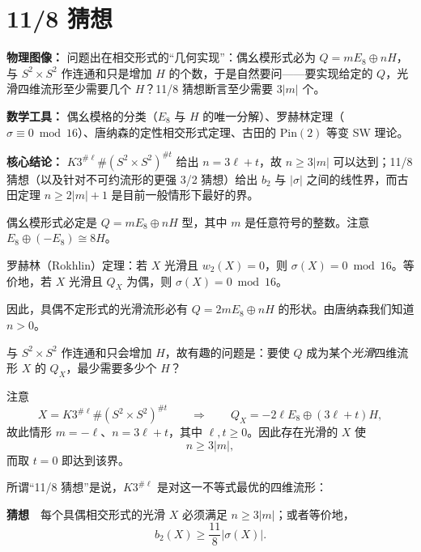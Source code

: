 \section{11/8 猜想}

\begin{keytakeaways}
\item \textbf{物理图像：} 问题出在相交形式的“几何实现”：偶幺模形式必为 $Q=mE_{8}\oplus nH$，与 $S^{2}\times S^{2}$ 作连通和只是增加 $H$ 的个数，于是自然要问——要实现给定的 $Q$，光滑四维流形至少需要几个 $H$？11/8 猜想断言至少需要 $3|m|$ 个。
\item \textbf{数学工具：} 偶幺模格的分类（$E_{8}$ 与 $H$ 的唯一分解）、罗赫林定理（$\sigma\equiv0\bmod16$）、唐纳森的定性相交形式定理、古田的 $\mathrm{Pin}(2)$ 等变 SW 理论。
\item \textbf{核心结论：} $K3^{\#\ell}\#(S^{2}\times S^{2})^{\# t}$ 给出 $n=3\ell+t$，故 $n\ge3|m|$ 可以达到；11/8 猜想（以及针对不可约流形的更强 3/2 猜想）给出 $b_{2}$ 与 $|\sigma|$ 之间的线性界，而古田定理 $n\ge2|m|+1$ 是目前一般情形下最好的界。
\end{keytakeaways}

偶幺模形式必定是 $Q=mE_{8}\oplus nH$ 型，其中 $m$ 是任意符号的整数。注意 $E_{8}\oplus(-E_{8})\cong8H$。

罗赫林（Rokhlin）定理：若 $X$ 光滑且 $w_{2}(X)=0$，则 $\sigma(X)=0\bmod16$。等价地，若 $X$ 光滑且 $Q_{X}$ 为偶，则 $\sigma(X)=0\bmod16$。

因此，具偶不定形式的光滑流形必有 $Q=2mE_{8}\oplus nH$ 的形状。由唐纳森我们知道 $n>0$。

与 $S^{2}\times S^{2}$ 作连通和只会增加 $H$，故有趣的问题是：要使 $Q$ 成为某个\emph{光滑}四维流形 $X$ 的 $Q_{X}$，最少需要多少个 $H$？

注意
\begin{equation}
X=K3^{\#\ell}\#(S^{2}\times S^{2})^{\# t}
\qquad\Rightarrow\qquad
Q_{X}=-2\ell E_{8}\oplus(3\ell+t)H,
\tag{B.1}
\end{equation}
故此情形 $m=-\ell$、$n=3\ell+t$，其中 $\ell,t\ge0$。因此存在光滑的 $X$ 使
\begin{equation}
n\ge3|m|,
\tag{B.2}
\end{equation}
而取 $t=0$ 即达到该界。

所谓“11/8 猜想”是说，$K3^{\#\ell}$ 是对这一不等式最优的四维流形：

\medskip
\noindent\textbf{猜想}　每个具偶相交形式的光滑 $X$ 必须满足 $n\ge3|m|$；或者等价地，
\begin{equation}
b_{2}(X)\ge\frac{11}{8}|\sigma(X)|.
\tag{B.3}
\end{equation}

